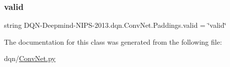 \subsubsection{\texorpdfstring{valid}{valid}}
{\footnotesize\ttfamily string D\+QN-\/Deepmind-\/N\+I\+PS-\/2013.dqn.\+Conv\+Net.\+Paddings.\+valid = \char`\"{}valid\char`\"{}\hspace{0.3cm}{\ttfamily [static]}}



The documentation for this class was generated from the following file\+:\begin{DoxyCompactItemize}
\item 
dqn/\hyperlink{ConvNet_8py}{Conv\+Net.\+py}\end{DoxyCompactItemize}
